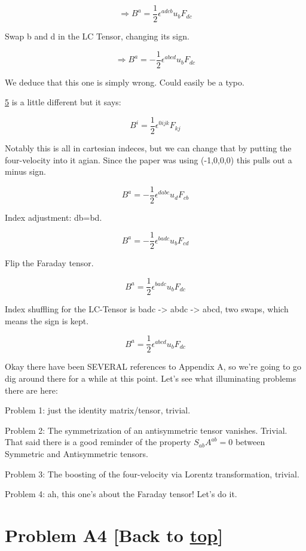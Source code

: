 \documentclass[landscape,letterpaper,10pt,english]{article}
\begin{document}
\[ \Rightarrow B^a = \frac12 \epsilon^{adcb}u_bF_{dc} \]

Swap b and d in the LC Tensor, changing its sign.

\[ \Rightarrow B^a = -\frac12 \epsilon^{abcd}u_bF_{dc} \]

We deduce that this one is simply wrong. Could easily be a typo.

\hyperref[5]{5} is a little different but it says:

\[ B^i = \frac12 \epsilon^{0ijk} F_{kj} \]

Notably this is all in cartesian indeces, but we can change that by
putting the four-velocity into it agian. Since the paper was using
(-1,0,0,0) this pulls out a minus sign.

\[ B^a = - \frac12 \epsilon^{dabc} u_d F_{cb} \]

Index adjustment: db=bd.

\[ B^a = - \frac12 \epsilon^{badc} u_b F_{cd} \]

Flip the Faraday tensor.

\[ B^a = \frac12 \epsilon^{badc} u_b F_{dc} \]

Index shuffling for the LC-Tensor is badc -\textgreater{} abdc
-\textgreater{} abcd, two swaps, which means the sign is kept.

\[ B^a = \frac12 \epsilon^{abcd} u_b F_{dc} \]

    Okay there have been SEVERAL references to Appendix A, so we're going to
go dig around there for a while at this point. Let's see what
illuminating problems there are here:

Problem 1: just the identity matrix/tensor, trivial.

Problem 2: The symmetrization of an antisymmetric tensor vanishes.
Trivial. That said there is a good reminder of the property
\(S_{ab}A^{ab} = 0\) between Symmetric and Antisymmetric tensors.

Problem 3: The boosting of the four-velocity via Lorentz transformation,
trivial.

Problem 4: ah, this one's about the Faraday tensor! Let's do it.

    \hypertarget{problem-a4-back-to-top}{%
\section{\texorpdfstring{Problem A4 {[}Back to
\hyperref[toc]{top}{]}}{Problem A4 {[}Back to {]}}}\label{problem-a4-back-to-top}}

\[\label{A4}\]
\end{document}
